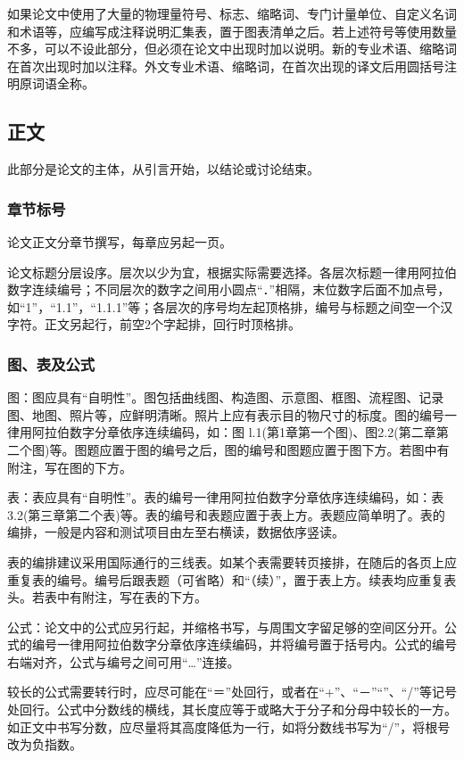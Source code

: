 \documentclass[a4paper,12pt,oneside,openany]{book}
\begin{document}
如果论文中使用了大量的物理量符号、标志、缩略词、专门计量单位、自定义名词和术语等，应编写成注释说明汇集表，置于图表清单之后。若上述符号等使用数量不多，可以不设此部分，但必须在论文中出现时加以说明。新的专业术语、缩略词在首次出现时加以注释。外文专业术语、缩略词，在首次出现的译文后用圆括号注明原词语全称。


\subsection{正文}

此部分是论文的主体，从引言开始，以结论或讨论结束。


\subsubsection{章节标号}

论文正文分章节撰写，每章应另起一页。

论文标题分层设序。层次以少为宜，根据实际需要选择。各层次标题一律用阿拉伯数字连续编号；不同层次的数字之间用小圆点“．”相隔，末位数字后面不加点号，如“1”，“1.1”，“1.1.1”等；各层次的序号均左起顶格排，编号与标题之间空一个汉字符。正文另起行，前空2个字起排，回行时顶格排。 


\subsubsection{图、表及公式}

图：图应具有“自明性”。图包括曲线图、构造图、示意图、框图、流程图、记录图、地图、照片等，应鲜明清晰。照片上应有表示目的物尺寸的标度。图的编号一律用阿拉伯数字分章依序连续编码，如：图
l.1(第1章第一个图)、图2.2(第二章第二个图)等。图题应置于图的编号之后，图的编号和图题应置于图下方。若图中有附注，写在图的下方。

表：表应具有“自明性”。表的编号一律用阿拉伯数字分章依序连续编码，如：表 3.2(第三章第二个表)等。表的编号和表题应置于表上方。表题应简单明了。表的编排，一般是内容和测试项目由左至右横读，数据依序竖读。

表的编排建议采用国际通行的三线表。如某个表需要转页接排，在随后的各页上应重复表的编号。编号后跟表题（可省略）和“（续）”，置于表上方。续表均应重复表头。若表中有附注，写在表的下方。

公式：论文中的公式应另行起，并缩格书写，与周围文字留足够的空间区分开。公式的编号一律用阿拉伯数字分章依序连续编码，并将编号置于括号内。公式的编号右端对齐，公式与编号之间可用“…”连接。

较长的公式需要转行时，应尽可能在“＝”处回行，或者在“+”、“－”“”、“/”等记号处回行。公式中分数线的横线，其长度应等于或略大于分子和分母中较长的一方。如正文中书写分数，应尽量将其高度降低为一行，如将分数线书写为“/”，将根号改为负指数。 
\end{document}
